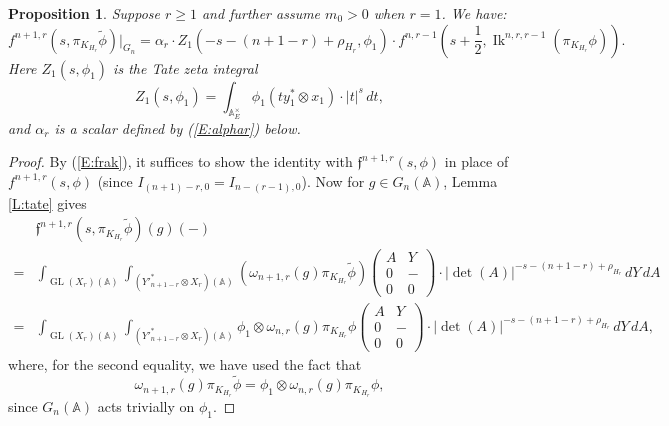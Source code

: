 \documentclass[10pt]{amsart}
\theoremstyle{plain}
\newtheorem{Prop}[equation]{Proposition}
\numberwithin{equation}{section}
\begin{document}
\begin{Prop}  \label{P:key2}
Suppose $r\geq 1$ and further assume $m_0>0$ when $r=1$. We have:
 \[ f^{n+1,r}(s, \pi_{K_{H_r}} \tilde{\phi})|_{G_{n}}
 = \alpha_r \cdot Z_1( -s  - (n+1-r) + \rho_{H_r}, \phi_1) \cdot
 f^{n,r-1}(  s + \frac{1}{2},  {\operatorname{Ik}}^{n,r, r-1}(\pi_{K_{H_r}}\phi)). \] 
 Here  $Z_1(s, \phi_1)$ is the Tate zeta integral
  \[  Z_1(s, \phi_1) =  \int_{{\mathbb{A}}_E^{\times}} \phi_1 (t y_1^* \otimes x_1)  \cdot |t|^s \, dt, \]
  and   $\alpha_r$ is a scalar defined by (\ref{E:alphar}) below. 
 \end{Prop}
 \begin{proof}
 By (\ref{E:frak}), it suffices to show the identity with
 $\mathfrak{f}^{n+1,r}(s,\phi)$ in place of $f^{n+1,r}(s,\phi)$ (since
 $I_{(n+1)  -r, 0 }  = I_{n - (r-1), 0}$).  Now  for $g\in G_n({\mathbb{A}})$,
 Lemma \ref{L:tate} gives
\begin{align*}
&  \mathfrak{f}^{n+1,r}(s, \pi_{K_{H_r}} \tilde{\phi})(g)(-)\\
=&\int _{{\operatorname{GL}}(X_r)({\mathbb{A}})}    \int_{({Y'}_{n+1-r}^* \otimes X_r)({\mathbb{A}})} 
(\omega_{n+1,r}(g) \pi_{K_{H_r}}\tilde{\phi})\begin{pmatrix}
A & Y  \\
0& - \\
0 & 0
 \end{pmatrix}    
\cdot |\det(A)|^{-s - (n+1-r) + \rho_{H_r}} \, dY \, dA\\
=& \int _{{\operatorname{GL}}(X_r)({\mathbb{A}})}    \int_{({Y'}_{n+1-r}^* \otimes X_r)({\mathbb{A}})} 
\phi_1\otimes\omega_{n,r}(g) \pi_{K_{H_r}}\phi\begin{pmatrix}
A & Y  \\
0& - \\
0 & 0
 \end{pmatrix}    
\cdot |\det(A)|^{-s - (n+1-r) + \rho_{H_r}} \, dY \, dA,
\end{align*}
where, for the second equality, we have used the fact that 
\[ \omega_{n+1,r}(g)
\pi_{K_{H_r}}\tilde{\phi}=\phi_1\otimes\omega_{n,r}(g)
\pi_{K_{H_r}}\phi, \]
since  $G_n({\mathbb{A}})$ acts trivially on $\phi_1$.
\vskip 5pt


\end{proof}
\end{document}
